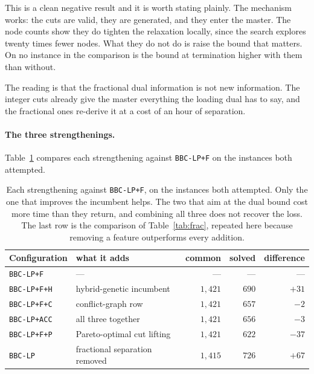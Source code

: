 This is a clean negative result and it is worth stating plainly. The mechanism works:
the cuts are valid, they are generated, and they enter the master. The node counts show
they do tighten the relaxation locally, since the search explores twenty times fewer
nodes. What they do not do is raise the bound that matters. On no instance in the
comparison is the bound at termination higher with them than without.

The reading is that the fractional dual information is not new information. The
integer cuts already give the master everything the loading dual has to say, and the
fractional ones re-derive it at a cost of an hour of separation.

\paragraph{The three strengthenings.}
Table~\ref{tab:ablation} compares each strengthening against \texttt{BBC-LP+F} on the
instances both attempted.

\begin{table}[h]\centering
\footnotesize
\begin{tabular}{@{}llrrr@{}}
\toprule
Configuration & what it adds & common & solved & difference\\
\midrule
\texttt{BBC-LP+F}   & ---                        & ---       & ---   & ---\\
\texttt{BBC-LP+F+H} & hybrid-genetic incumbent   & $1{,}421$ & $690$ & $+31$\\
\texttt{BBC-LP+F+C} & conflict-graph row         & $1{,}421$ & $657$ & $-2$\\
\texttt{BBC-LP+ACC} & all three together         & $1{,}421$ & $656$ & $-3$\\
\texttt{BBC-LP+F+P} & Pareto-optimal cut lifting & $1{,}421$ & $622$ & $-37$\\
\midrule
\texttt{BBC-LP}     & fractional separation removed & $1{,}415$ & $726$ & $+67$\\
\bottomrule
\end{tabular}
\caption{Each strengthening against \texttt{BBC-LP+F}, on the instances both attempted.
Only the one that improves the incumbent helps. The two that aim at the dual bound
cost more time than they return, and combining all three does not recover the loss.
The last row is the comparison of Table~\ref{tab:frac}, repeated here because removing
a feature outperforms every addition.}
\label{tab:ablation}
\end{table}

